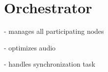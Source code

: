 


\chapter{Orchestrator}

- manages all participating nodes

- optimizes audio 

- handles synchronization task